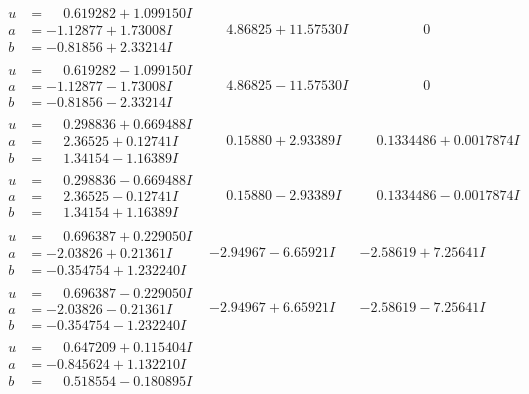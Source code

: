 \documentclass[1p]{elsarticle_modified}
\theoremstyle{definition}
\begin{document}
$$\begin{array}{c|c|c}
\begin{aligned}
u &= \phantom{-}0.619282 + 1.099150 I \\
a &= -1.12877 + 1.73008 I \\
b &= -0.81856 + 2.33214 I\end{aligned}
 & \phantom{-}4.86825 + 11.57530 I & \phantom{-0.000000 } 0 \\ \hline\begin{aligned}
u &= \phantom{-}0.619282 - 1.099150 I \\
a &= -1.12877 - 1.73008 I \\
b &= -0.81856 - 2.33214 I\end{aligned}
 & \phantom{-}4.86825 - 11.57530 I & \phantom{-0.000000 } 0 \\ \hline\begin{aligned}
u &= \phantom{-}0.298836 + 0.669488 I \\
a &= \phantom{-}2.36525 + 0.12741 I \\
b &= \phantom{-}1.34154 - 1.16389 I\end{aligned}
 & \phantom{-}0.15880 + 2.93389 I & \phantom{-}0.1334486 + 0.0017874 I \\ \hline\begin{aligned}
u &= \phantom{-}0.298836 - 0.669488 I \\
a &= \phantom{-}2.36525 - 0.12741 I \\
b &= \phantom{-}1.34154 + 1.16389 I\end{aligned}
 & \phantom{-}0.15880 - 2.93389 I & \phantom{-}0.1334486 - 0.0017874 I \\ \hline\begin{aligned}
u &= \phantom{-}0.696387 + 0.229050 I \\
a &= -2.03826 + 0.21361 I \\
b &= -0.354754 + 1.232240 I\end{aligned}
 & -2.94967 - 6.65921 I & -2.58619 + 7.25641 I \\ \hline\begin{aligned}
u &= \phantom{-}0.696387 - 0.229050 I \\
a &= -2.03826 - 0.21361 I \\
b &= -0.354754 - 1.232240 I\end{aligned}
 & -2.94967 + 6.65921 I & -2.58619 - 7.25641 I \\ \hline\begin{aligned}
u &= \phantom{-}0.647209 + 0.115404 I \\
a &= -0.845624 + 1.132210 I \\
b &= \phantom{-}0.518554 - 0.180895 I\end{aligned}

\end{array}$$
\end{document}
